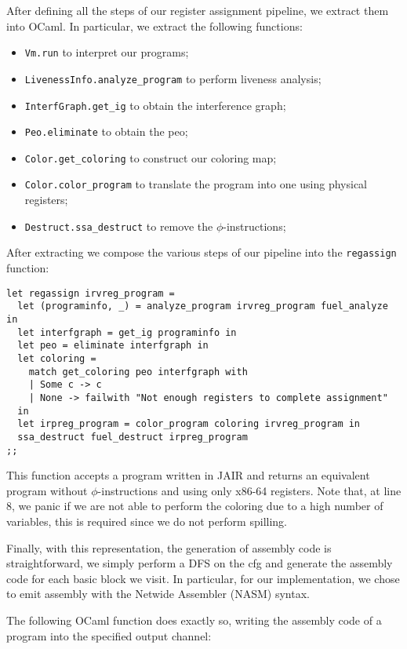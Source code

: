 After defining all the steps of our register assignment pipeline, we extract them into OCaml.
In particular, we extract the following functions:
\begin{itemize}
  \item \texttt{Vm.run} to interpret our programs;
  \item \texttt{LivenessInfo.analyze\_program} to perform liveness analysis;
  \item \texttt{InterfGraph.get\_ig} to obtain the interference graph;
  \item \texttt{Peo.eliminate} to obtain the \gls{peo};
  \item \texttt{Color.get\_coloring} to construct our coloring map;
  \item \texttt{Color.color\_program} to translate the program into one using physical registers;
  \item \texttt{Destruct.ssa\_destruct} to remove the $\phi$-instructions;
\end{itemize}

After extracting we compose the various steps of our pipeline into the \texttt{regassign} function:

\begin{lstlisting}[style=OCaml]
let regassign irvreg_program =
  let (programinfo, _) = analyze_program irvreg_program fuel_analyze in
  let interfgraph = get_ig programinfo in
  let peo = eliminate interfgraph in
  let coloring =
    match get_coloring peo interfgraph with
    | Some c -> c
    | None -> failwith "Not enough registers to complete assignment"
  in
  let irpreg_program = color_program coloring irvreg_program in
  ssa_destruct fuel_destruct irpreg_program
;;
\end{lstlisting}

This function accepts a program written in JAIR and returns an equivalent program without $\phi$-instructions and using only x86-64 registers.
Note that, at line 8, we panic if we are not able to perform the coloring due to a high number of variables, this is required since we do not perform spilling.

Finally, with this representation, the generation of assembly code is straightforward, we simply perform a DFS on the \gls{cfg} and generate the assembly code for each basic block we visit.
In particular, for our implementation, we chose to emit assembly with the Netwide Assembler (NASM) syntax.

The following OCaml function does exactly so, writing the assembly code of a program into the specified output channel:

